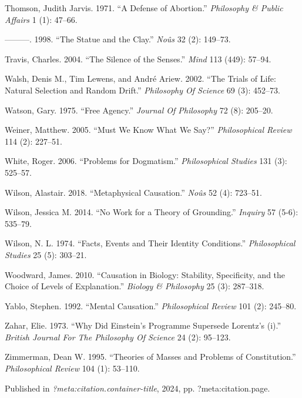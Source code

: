 \documentclass[
  10pt,
  letterpaper,
  DIV=11,
  numbers=noendperiod,
  twoside]{scrartcl}
\newlength{\cslhangindent}
\newenvironment{CSLReferences}[2] %
 {\begin{list}{}{%
  \setlength{\itemindent}{0pt}
  \setlength{\leftmargin}{0pt}
  \setlength{\parsep}{0pt}
  \ifodd #1
   \setlength{\leftmargin}{\cslhangindent}
   \setlength{\itemindent}{-1\cslhangindent}
  \fi
  \setlength{\itemsep}{#2\baselineskip}}}
 {\end{list}}
\begin{document}
\begin{CSLReferences}{1}{0}
Thomson, Judith Jarvis. 1971. {``A Defense of Abortion.''}
\emph{Philosophy \& Public Affairs} 1 (1): 47--66.

---------. 1998. {``The Statue and the Clay.''} \emph{Noûs} 32 (2):
149--73.

Travis, Charles. 2004. {``The Silence of the Senses.''} \emph{Mind} 113
(449): 57--94.

Walsh, Denis M., Tim Lewens, and André Ariew. 2002. {``The Trials of
Life: Natural Selection and Random Drift.''} \emph{Philosophy Of
Science} 69 (3): 452--73.

Watson, Gary. 1975. {``Free Agency.''} \emph{Journal Of Philosophy} 72
(8): 205--20.

Weiner, Matthew. 2005. {``Must We Know What We Say?''}
\emph{Philosophical Review} 114 (2): 227--51.

White, Roger. 2006. {``Problems for Dogmatism.''} \emph{Philosophical
Studies} 131 (3): 525--57.

Wilson, Alastair. 2018. {``Metaphysical Causation.''} \emph{Noûs} 52
(4): 723--51.

Wilson, Jessica M. 2014. {``No Work for a Theory of Grounding.''}
\emph{Inquiry} 57 (5-6): 535--79.

Wilson, N. L. 1974. {``Facts, Events and Their Identity Conditions.''}
\emph{Philosophical Studies} 25 (5): 303--21.

Woodward, James. 2010. {``Causation in Biology: Stability, Specificity,
and the Choice of Levels of Explanation.''} \emph{Biology \& Philosophy}
25 (3): 287--318.

Yablo, Stephen. 1992. {``Mental Causation.''} \emph{Philosophical
Review} 101 (2): 245--80.

Zahar, Elie. 1973. {``Why Did Einstein's Programme Supersede Lorentz's
(i).''} \emph{British Journal For The Philosophy Of Science} 24 (2):
95--123.

Zimmerman, Dean W. 1995. {``Theories of Masses and Problems of
Constitution.''} \emph{Philosophical Review} 104 (1): 53--110.

\end{CSLReferences}



\noindent Published in\emph{
?meta:citation.container-title}, 2024, pp. ?meta:citation.page.
\end{document}
